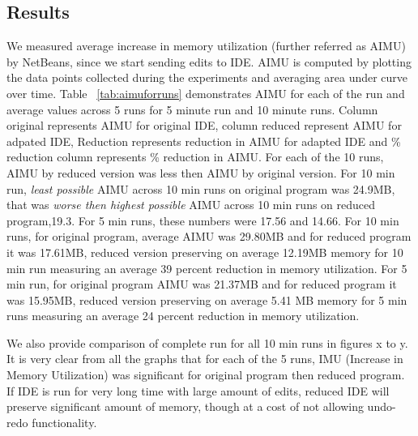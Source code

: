 \subsection{Results}
We measured average increase in memory utilization (further referred as AIMU) by NetBeans, since we start sending edits to IDE. AIMU is computed by plotting the data points collected during the experiments and averaging area under curve over time. Table ~\ref{tab:aimuforruns} demonstrates AIMU for each of the run and average values across 5 runs for 5 minute run and 10 minute runs. Column original represents AIMU for original IDE, column reduced represent AIMU for adpated IDE, Reduction represents reduction in AIMU for adapted IDE and \% reduction column represents \% reduction in AIMU. For each of the 10 runs, AIMU by reduced version was less then AIMU by original version. For 10 min run, \emph{least possible} AIMU across 10 min runs on original program was 24.9MB, that was \emph{worse then highest possible} AIMU across 10 min runs on reduced program,19.3. For 5 min runs, these numbers were 17.56 and 14.66.  For 10 min runs, for original program, average AIMU was 29.80MB and for reduced program it was 17.61MB, reduced version preserving on average 12.19MB memory for 10 min run measuring an average 39 percent reduction in memory utilization. For 5 min run, for original program AIMU was 21.37MB and for reduced program it was 15.95MB, reduced version preserving on average 5.41 MB memory for 5 min runs measuring an average 24 percent reduction in memory utilization. 

We also provide comparison of complete run for all 10 min runs in figures x to y. It is very clear from all the graphs that for each of the 5 runs, IMU (Increase in Memory Utilization) was significant for original program then reduced program. If IDE is run for very long time with large amount of edits, reduced IDE will preserve significant amount of memory, though at a cost of not allowing undo-redo functionality.

    



   
 


   

 


